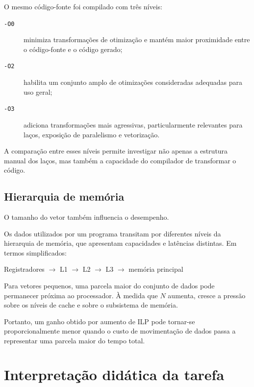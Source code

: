 O mesmo código-fonte foi compilado com três níveis:

\begin{description}
    \item[\texttt{-O0}] minimiza transformações de otimização e mantém maior proximidade
    entre o código-fonte e o código gerado;
    
    \item[\texttt{-O2}] habilita um conjunto amplo de otimizações consideradas adequadas
    para uso geral;
    
    \item[\texttt{-O3}] adiciona transformações mais agressivas, particularmente relevantes
    para laços, exposição de paralelismo e vetorização.
\end{description}

A comparação entre esses níveis permite investigar não apenas a estrutura manual dos laços,
mas também a capacidade do compilador de transformar o código.


\subsection{Hierarquia de memória}

O tamanho do vetor também influencia o desempenho.

Os dados utilizados por um programa transitam por diferentes níveis da hierarquia de memória,
que apresentam capacidades e latências distintas. Em termos simplificados:

\begin{center}
Registradores
\(\rightarrow\)
L1
\(\rightarrow\)
L2
\(\rightarrow\)
L3
\(\rightarrow\)
memória principal
\end{center}

Para vetores pequenos, uma parcela maior do conjunto de dados pode permanecer próxima ao
processador. À medida que \(N\) aumenta, cresce a pressão sobre os níveis de cache e sobre o
subsistema de memória.

Portanto, um ganho obtido por aumento de ILP pode tornar-se proporcionalmente menor quando
o custo de movimentação de dados passa a representar uma parcela maior do tempo total.


\section{Interpretação didática da tarefa}

\label{sec:atvd02-interpretacao}


